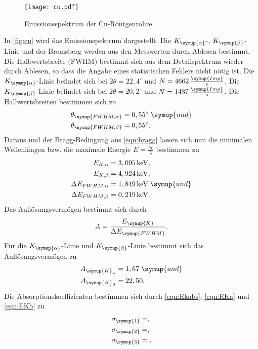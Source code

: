 \begin{figure}
  \centering
  \texttt{[image: cu.pdf]}
  \caption{Emissionsspektrum der Cu-Röntgenröhre.}
  \label{fig:cu}
\end{figure}
In \autoref{fig:cu} wird das Emissionspektrum dargestellt. Die $K_{\symup{\alpha}}$-, $K_{\symup{\beta}}$-Linie und
der Bremsberg werden aus den Messwerten durch Ablesen bestimmt. Die Halbwertsbreite (FWHM) bestimmt sich aus dem
Detailspektrum wieder durch Ablesen, so dass die Angabe eines statistischen Fehlers nicht nötig ist.
Die $K_{\symup{\alpha}}$-Linie befindet sich bei $2\theta=22,4^{\circ}$ und 
$N = 4662\,\frac{\symup{Imp}}{\unit{\second}}$. Die $K_{\symup{\beta}}$-Linie befindet sich bei 
$2\theta=20,2^{\circ}$ und $N = 1437\,\frac{\symup{Imp}}{\unit{\second}}$. Die Halbwertsbreiten bestimmen sich zu
\begin{align*}
  \theta_{\symup{FWHM, \alpha}} &= 0,55^{\circ} \; \symup{und} \\
  \theta_{\symup{FWHM, \beta}} &= 0,55^{\circ}. 
\end{align*}
Daraus und der Bragg-Bedingung aus \autoref{eqn:bragg} lassen sich nun die minimalen Wellenlängen bzw.
die maximale Energie $E = \frac{hc}{\lambda}$ bestimmen zu
\begin{align*}
  E_{K,\alpha}           &= 3,095\,\unit{\kilo\eV},\\
  E_{K, \beta}           &= 4,924\,\unit{\kilo\eV},\\
  \Delta E_{FWHM,\alpha} &= 1,849\,\unit{\kilo\eV} \; \symup{und}\\
  \Delta E_{FWHM,\beta}  &= 0,219\,\unit{\kilo\eV}.
\end{align*}
Das Auflösungsvermögen bestimmt sich durch
\begin{align*}
  A = \frac{E_{\symup{K}}}{\Delta E_{\symup{FWHM}}}.
\end{align*}
Für die $K_{\symup{\alpha}}$-Linie und $K_{\symup{\beta}}$-Linie bestimmt sich das Auflösungsvermögen zu
\begin{align*}
  A_{\symup{K}_{\alpha}}  &=  1,67 \; \symup{und}\\
  A_{\symup{K}_{\beta}}   &= 22,50.
\end{align*}
Die Absorptionskoeffizienten bestimmen sich durch \autoref{eqn:Ekabs}, \autoref{eqn:EKa} und
\autoref{eqn:EKb} zu
\begin{align*}
  \sigma_{\symup{1}} &= ,\\
  \sigma_{\symup{2}} &= ,\\
  \sigma_{\symup{3}} &= .
\end{align*}